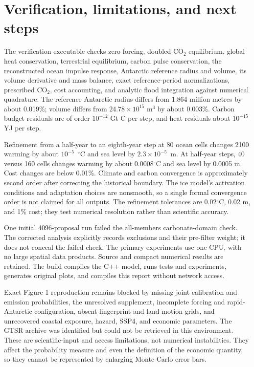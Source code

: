 \documentclass[11pt]{article}
\begin{document}
\section{Verification, limitations, and next steps}
The verification executable checks zero forcing, doubled-CO$_2$ equilibrium,
global heat conservation, terrestrial equilibrium, carbon pulse conservation,
the reconstructed ocean impulse response, Antarctic reference radius and
volume, its volume derivative and mass balance, exact reference-period
normalizations, prescribed CO$_2$, cost accounting, and analytic flood
integration against numerical quadrature. The reference Antarctic radius
differs from 1.864 million metres by about 0.019\%; volume differs from
$24.78\times10^{15}$ m$^3$ by about 0.003\%. Carbon budget residuals are of
order $10^{-12}$ Gt C per step, and heat residuals about $10^{-15}$ YJ per step.

Refinement from a half-year to an eighth-year step at 80 ocean cells changes
2100 warming by about $10^{-5}$~$^\circ$C and sea level by $2.3\times10^{-5}$~m.
At half-year steps, 40 versus 160 cells changes warming by about 0.0008$^\circ$C
and sea level by 0.0005 m. Cost changes are below 0.01\%. Climate and carbon
convergence is approximately second order after correcting the historical
boundary. The ice model's activation conditions and adaptation choices are
nonsmooth, so a single formal convergence order is not claimed for all outputs.
The refinement tolerances are 0.02$^\circ$C, 0.02 m, and 1\% cost; they test
numerical resolution rather than scientific accuracy.

One initial 4096-proposal run failed the all-members carbonate-domain check.
The corrected analysis explicitly records exclusions and their pre-filter
weight; it does not conceal the failed check. The primary experiments use one
CPU, with no large spatial data products. Source and compact numerical results
are retained. The build compiles the C++ model, runs tests and experiments,
generates original plots, and compiles this report without network access.

Exact Figure 1 reproduction remains blocked by missing joint calibration and
emission probabilities, the unresolved supplement, incomplete forcing and
rapid-Antarctic configuration, absent fingerprint and land-motion grids, and
unrecovered coastal exposure, hazard, SSP4, and economic parameters. The GTSR
archive was identified but could not be retrieved in this environment.
These are scientific-input and access limitations, not numerical instabilities.
They affect the probability measure and even the definition of the economic
quantity, so they cannot be represented by enlarging Monte Carlo error bars.
\end{document}
